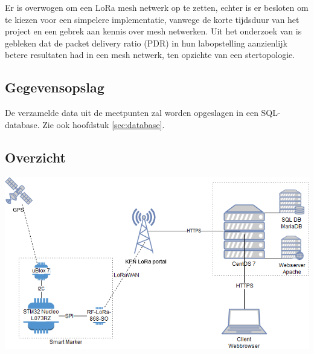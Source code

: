 Er is overwogen om een LoRa mesh netwerk op te zetten, echter is er besloten om te kiezen voor een simpelere implementatie, vanwege de korte tijdsduur van het project en een gebrek aan kennis over mesh netwerken. Uit het onderzoek van \citep{AIM_HI_LORA_WMN} is gebleken dat de packet delivery ratio (PDR) in hun labopstelling aanzienlijk betere resultaten had in een mesh netwerk, ten opzichte van een stertopologie.

\subsection{Gegevensopslag}
De verzamelde data uit de meetpunten zal worden opgeslagen in een SQL-database.
Zie ook hoofdstuk \ref{sec:database}.

\label{subsec:overzicht}
\subsection{Overzicht}
\includegraphics[width=\textwidth]{technical/system_architecture.png}
